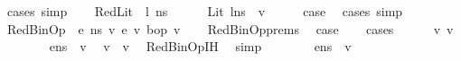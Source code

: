 \begin{isabellebody}
\ {\isacharparenleft}{\kern0pt}cases{\isacharsemicolon}{\kern0pt}\ simp{\isacharparenright}{\kern0pt}\isanewline
{}\isamarkupfalse%
\isanewline
\ \ \isamarkupfalse%
\ {\isacharparenleft}{\kern0pt}RedLit\ {\isasymOmega}\ l\ n{\isacharunderscore}{\kern0pt}s{\isacharparenright}{\kern0pt}\isanewline
\ \ \isamarkupfalse%
\ {\isachardoublequoteopen}{\isasymLambda}{\isacharcomma}{\kern0pt}{\isasymGamma}{\isacharcomma}{\kern0pt}{\isasymOmega}\ {\isasymturnstile}\ {\isasymlangle}Lit\ l{\isacharcomma}{\kern0pt}n{\isacharunderscore}{\kern0pt}s{\isasymrangle}\ {\isasymDown}\ v{\isacharprime}{\kern0pt}{\isachardoublequoteclose}\isanewline
\ \ \isamarkupfalse%
\ \isamarkupfalse%
\ {\isacharquery}{\kern0pt}case\ \isamarkupfalse%
\ {\isacharparenleft}{\kern0pt}cases{\isacharsemicolon}{\kern0pt}\ simp{\isacharparenright}{\kern0pt}\isanewline
{}\isamarkupfalse%
\isanewline
\ \ \isamarkupfalse%
\ {\isacharparenleft}{\kern0pt}RedBinOp\ {\isasymOmega}\ e{}\ n{\isacharunderscore}{\kern0pt}s\ v{}\ e{}\ v{}\ bop\ v{\isacharparenright}{\kern0pt}\isanewline
\ \ \isamarkupfalse%
\ RedBinOp{\isachardot}{\kern0pt}prems\ \isamarkupfalse%
\ {\isacharquery}{\kern0pt}case\isanewline
\ \ \isamarkupfalse%
\ {\isacharparenleft}{\kern0pt}cases{\isacharparenright}{\kern0pt}\isanewline
\ \ \ \ \isamarkupfalse%
\ v{}{\isacharprime}{\kern0pt}\ v{}{\isacharprime}{\kern0pt}\isanewline
\ \ \ \ \isamarkupfalse%
\ {\isachardoublequoteopen}{\isasymLambda}{\isacharcomma}{\kern0pt}{\isasymGamma}{\isacharcomma}{\kern0pt}{\isasymOmega}\ {\isasymturnstile}\ {\isasymlangle}e{}{\isacharcomma}{\kern0pt}n{\isacharunderscore}{\kern0pt}s{\isasymrangle}\ {\isasymDown}\ v{}{\isacharprime}{\kern0pt}{\isachardoublequoteclose}\ \isamarkupfalse%
\ {\isachardoublequoteopen}v{}\ {\isacharequal}{\kern0pt}\ v{}{\isacharprime}{\kern0pt}{\isachardoublequoteclose}\ \isamarkupfalse%
\ RedBinOp{\isachardot}{\kern0pt}IH\ \isamarkupfalse%
\ simp\isanewline
\ \ \ \ \isamarkupfalse%
\ {\isachardoublequoteopen}{\isasymLambda}{\isacharcomma}{\kern0pt}{\isasymGamma}{\isacharcomma}{\kern0pt}{\isasymOmega}\ {\isasymturnstile}\ {\isasymlangle}e{}{\isacharcomma}{\kern0pt}n{\isacharunderscore}{\kern0pt}s{\isasymrangle}\ {\isasymDown}\ v{}{\isacharprime}{\kern0pt}{\isachardoublequoteclose}\ \isamarkupfalse%

\end{isabellebody}
